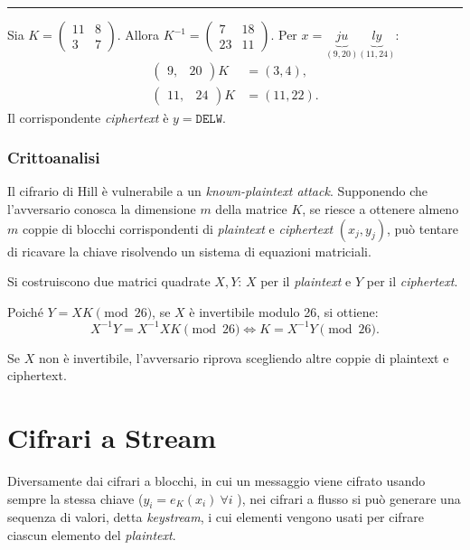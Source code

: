 \vspace{1em}
\hrule
\begin{example}
Sia $K = \begin{pmatrix} 11 & 8 \\ 3 & 7\end{pmatrix}$. Allora $K^{-1} = \begin{pmatrix} 7 & 18\\ 23 & 11 \end{pmatrix}$. Per $x=\underbrace{ju}_{(9,20)} \underbrace{ly}_{(11,24)}$:
\begin{align*}
    \begin{pmatrix}9, & 20\end{pmatrix}K &= (3,4),\\
    \begin{pmatrix}11, & 24\end{pmatrix}K &= (11,22).
\end{align*}
Il corrispondente \textit{ciphertext} è $y = \texttt{DELW}$.
\end{example}

\subsubsection{Crittoanalisi}
Il cifrario di Hill è vulnerabile a un \textit{known-plaintext attack}.
Supponendo che l'avversario conosca la dimensione \(m\) della matrice \(K\), se riesce a ottenere almeno \(m\) coppie di blocchi corrispondenti di \textit{plaintext} e \textit{ciphertext} \((x_j,y_j)\), può tentare di ricavare la chiave risolvendo un sistema
di equazioni matriciali.

\vspace{1em}\noindent Si costruiscono due matrici quadrate \(X,Y\): $X$ per il \textit{plaintext} e $Y$ per il \textit{ciphertext}.

\vspace{1em}\noindent  Poiché $Y=XK \pmod{26}$, se \(X\) è invertibile modulo 26, si ottiene:
\[
X^{-1}Y=X^{-1}XK \pmod{26} \iff  K=X^{-1}Y \pmod{26}. 
\]

\noindent Se \(X\) non è invertibile, l'avversario riprova scegliendo
altre coppie di plaintext e ciphertext. 

\newpage
\section{Cifrari a Stream}
Diversamente dai cifrari a blocchi, in cui un messaggio viene cifrato usando sempre la stessa chiave ($y_i=e_K(x_i) \ \forall i$ ), nei cifrari a flusso si può generare una sequenza di valori, detta \textit{keystream}, i cui elementi vengono usati per cifrare ciascun elemento del \textit{plaintext}. 
